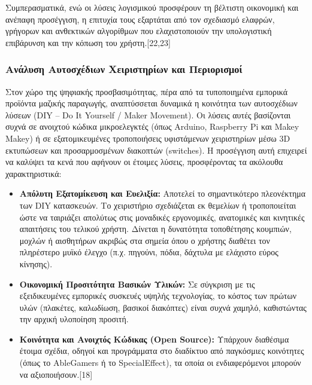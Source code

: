 \documentclass[twoside, a4paper, 11pt]{article}
\newcommand{\textlatin}[1]{\textenglish{#1}}
\begin{document}
Συμπερασματικά, ενώ οι λύσεις λογισμικού προσφέρουν τη βέλτιστη οικονομική και ανέπαφη προσέγγιση, η επιτυχία τους εξαρτάται από τον σχεδιασμό ελαφρών, γρήγορων και ανθεκτικών αλγορίθμων που ελαχιστοποιούν την υπολογιστική επιβάρυνση και την κόπωση του χρήστη.[22,23]

\subsubsection{Ανάλυση Αυτοσχέδιων Χειριστηρίων και Περιορισμοί}

Στον χώρο της ψηφιακής προσβασιμότητας, πέρα από τα τυποποιημένα εμπορικά προϊόντα μαζικής παραγωγής, αναπτύσσεται δυναμικά η κοινότητα των αυτοσχέδιων λύσεων (\textlatin{DIY -- Do It Yourself / Maker Movement}). Οι λύσεις αυτές βασίζονται συχνά σε ανοιχτού κώδικα μικροελεγκτές (όπως \textlatin{Arduino, Raspberry Pi} και \textlatin{Makey Makey}) ή σε εξατομικευμένες τροποποιήσεις υφιστάμενων χειριστηρίων μέσω \textlatin{3D} εκτυπώσεων και προσαρμοσμένων διακοπτών (\textlatin{switches}). Η προσέγγιση αυτή επιχειρεί να καλύψει τα κενά που αφήνουν οι έτοιμες λύσεις, προσφέροντας τα ακόλουθα χαρακτηριστικά:

\begin{itemize}
    \item \textbf{Απόλυτη Εξατομίκευση και Ευελιξία:} Αποτελεί το σημαντικότερο πλεονέκτημα των \textlatin{DIY} κατασκευών. Το χειριστήριο σχεδιάζεται εκ θεμελίων ή τροποποιείται ώστε να ταιριάζει απολύτως στις μοναδικές εργονομικές, ανατομικές και κινητικές απαιτήσεις του τελικού χρήστη. Δίνεται η δυνατότητα τοποθέτησης κουμπιών, μοχλών ή αισθητήρων ακριβώς στα σημεία όπου ο χρήστης διαθέτει τον πληρέστερο μυϊκό έλεγχο (π.χ. πηγούνι, πόδια, δάχτυλα με ελάχιστο εύρος κίνησης).
    
    \item \textbf{Οικονομική Προσιτότητα Βασικών Υλικών:} Σε σύγκριση με τις εξειδικευμένες εμπορικές συσκευές υψηλής τεχνολογίας, το κόστος των πρώτων υλών (πλακέτες, καλωδίωση, βασικοί διακόπτες) είναι συχνά χαμηλό, καθιστώντας την αρχική υλοποίηση προσιτή.
    
    \item \textbf{Κοινότητα και Ανοιχτός Κώδικας (\textlatin{Open Source}):} Υπάρχουν διαθέσιμα έτοιμα σχέδια, οδηγοί και προγράμματα στο διαδίκτυο από παγκόσμιες κοινότητες (όπως το \textlatin{AbleGamers} ή το \textlatin{SpecialEffect}), τα οποία οι ενδιαφερόμενοι μπορούν να αξιοποιήσουν.[18]
\end{itemize}
\end{document}
